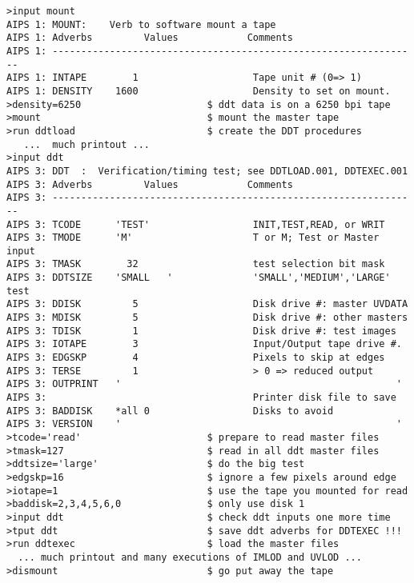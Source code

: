 \begin{verbatim}
>input mount
AIPS 1: MOUNT:    Verb to software mount a tape
AIPS 1: Adverbs         Values            Comments
AIPS 1: ----------------------------------------------------------------
AIPS 1: INTAPE        1                    Tape unit # (0=> 1)
AIPS 1: DENSITY    1600                    Density to set on mount.
>density=6250                      $ ddt data is on a 6250 bpi tape
>mount                             $ mount the master tape
>run ddtload                       $ create the DDT procedures
   ...  much printout ...
>input ddt
AIPS 3: DDT  :  Verification/timing test; see DDTLOAD.001, DDTEXEC.001
AIPS 3: Adverbs         Values            Comments
AIPS 3: ----------------------------------------------------------------
AIPS 3: TCODE      'TEST'                  INIT,TEST,READ, or WRIT
AIPS 3: TMODE      'M'                     T or M; Test or Master input
AIPS 3: TMASK        32                    test selection bit mask
AIPS 3: DDTSIZE    'SMALL   '              'SMALL','MEDIUM','LARGE' test
AIPS 3: DDISK         5                    Disk drive #: master UVDATA
AIPS 3: MDISK         5                    Disk drive #: other masters
AIPS 3: TDISK         1                    Disk drive #: test images
AIPS 3: IOTAPE        3                    Input/Output tape drive #.
AIPS 3: EDGSKP        4                    Pixels to skip at edges
AIPS 3: TERSE         1                    > 0 => reduced output
AIPS 3: OUTPRINT   '                                                '
AIPS 3:                                    Printer disk file to save
AIPS 3: BADDISK    *all 0                  Disks to avoid
AIPS 3: VERSION    '                                                '
>tcode='read'                      $ prepare to read master files
>tmask=127                         $ read in all ddt master files
>ddtsize='large'                   $ do the big test
>edgskp=16                         $ ignore a few pixels around edge
>iotape=1                          $ use the tape you mounted for read
>baddisk=2,3,4,5,6,0               $ only use disk 1
>input ddt                         $ check ddt inputs one more time
>tput ddt                          $ save ddt adverbs for DDTEXEC !!!
>run ddtexec                       $ load the master files
  ... much printout and many executions of IMLOD and UVLOD ...
>dismount                          $ go put away the tape
\end{verbatim}

